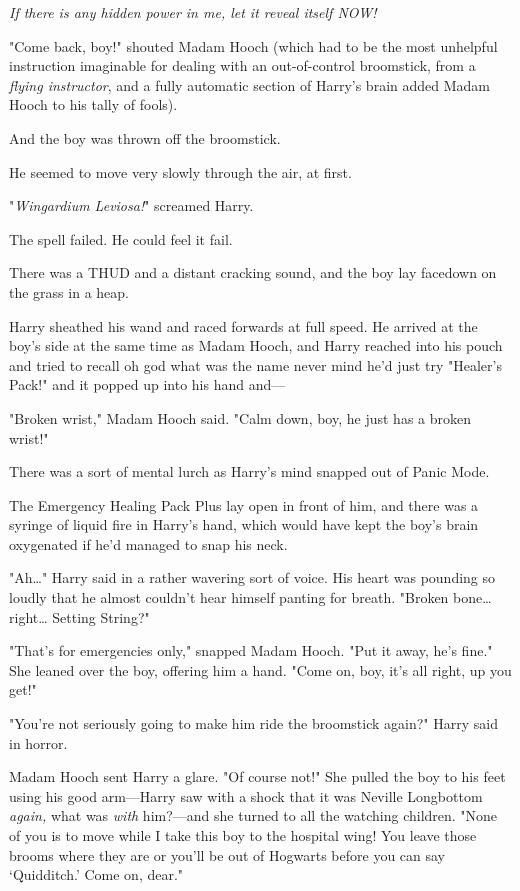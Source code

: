 \emph{If there is any hidden power in me, let it reveal itself NOW!}

"Come back, boy!" shouted Madam Hooch (which had to be the most unhelpful 
instruction imaginable for dealing with an out-of-control broomstick, from a 
\emph{flying instructor}, and a fully automatic section of Harry's brain added 
Madam Hooch to his tally of fools).

And the boy was thrown off the broomstick.

He seemed to move very slowly through the air, at first.

"\emph{Wingardium Leviosa!}" screamed Harry.

The spell failed. He could feel it fail.

There was a THUD and a distant cracking sound, and the boy lay facedown on the 
grass in a heap.

Harry sheathed his wand and raced forwards at full speed. He arrived at the 
boy's side at the same time as Madam Hooch, and Harry reached into his pouch 
and tried to recall oh god what was the name never mind he'd just try "Healer's 
Pack!" and it popped up into his hand and---

"Broken wrist," Madam Hooch said. "Calm down, boy, he just has a broken wrist!"

There was a sort of mental lurch as Harry's mind snapped out of Panic Mode.

The Emergency Healing Pack Plus lay open in front of him, and there was a 
syringe of liquid fire in Harry's hand, which would have kept the boy's brain 
oxygenated if he'd managed to snap his neck.

"Ah{\ldots}" Harry said in a rather wavering sort of voice. His heart was 
pounding so loudly that he almost couldn't hear himself panting for breath. 
"Broken bone{\ldots} right{\ldots} Setting String?"

"That's for emergencies only," snapped Madam Hooch. "Put it away, he's fine." 
She leaned over the boy, offering him a hand. "Come on, boy, it's all right, up 
you get!"

"You're not seriously going to make him ride the broomstick again?" Harry said 
in horror.

Madam Hooch sent Harry a glare. "Of course not!" She pulled the boy to his feet 
using his good arm---Harry saw with a shock that it was Neville Longbottom 
\emph{again,} what was \emph{with} him?---and she turned to all the watching 
children. "None of you is to move while I take this boy to the hospital wing! 
You leave those brooms where they are or you'll be out of Hogwarts before you 
can say `Quidditch.' Come on, dear."

